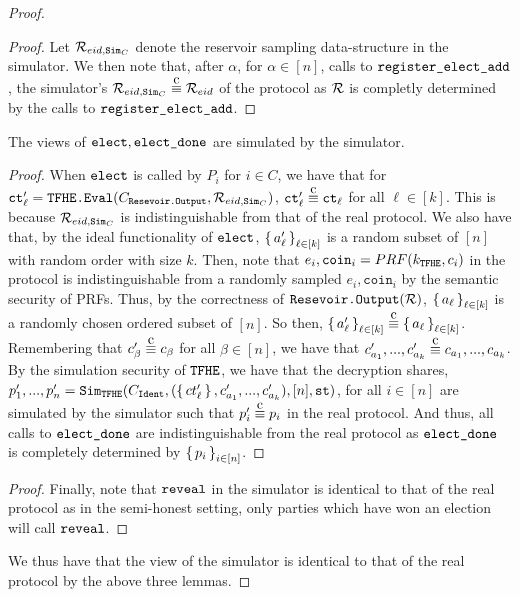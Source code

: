 \begin{theorem}
\begin{proof}
\begin{lemma}
\begin{proof}
				Let $\mathcal{R}_{{eid}, \texttt{Sim}_C}$ denote the reservoir sampling data-structure in the simulator.
				We then note that, after $\alpha$, for $\alpha \in [n]$,  calls to $\texttt{register\_elect\_add}$, the simulator's $\resSampling_{\eid, \simCMSLE} \compInd \resSampling_\eid$
				of the protocol as $\mathcal{R}$ is completly determined by the calls to $\texttt{register\_elect\_add}$.
			\end{proof}
		\end{lemma}
		\begin{lemma}
			The views of $\texttt{elect}, \texttt{elect\_done}$ are simulated by the simulator.
			\begin{proof}
				When $\texttt{elect}$ is called by $P_i$ for $i \in C$, we have that for $\texttt{ct}'_\ell = \texttt{TFHE.Eval}(C_{\texttt{Resevoir.Output}}, \mathcal{R}_{{eid}, \texttt{Sim}_C})$, $\ct'_\ell \compInd \ct_\ell$ for all $\ell \in [k]$.
				This is because $\mathcal{R}_{{eid}, \texttt{Sim}_C}$ is indistinguishable from that of the real protocol.
				We also have that, by the ideal functionality of $\texttt{elect}$, $\set{a'_\ell}_{\ell \in [k]}$ is a random subset of $[n]$ with random order with size $k$.
				Then, note that $e_i, \texttt{coin}_i = PRF(k_{\texttt{TFHE}}, c_i)$ in the protocol is indistinguishable from a randomly sampled $e_i, \texttt{coin}_i$
				by the semantic security of PRFs. Thus, by the correctness of $\texttt{Resevoir.Output}(\mathcal{R})$, $\set{a_\ell}_{\ell \in [k]}$ is a randomly chosen ordered subset of $[n]$.
				So then, $\set{a'_\ell}_{\ell \in [k]} \compInd \set{a_\ell}_{\ell \in [k]}$.
				Remembering that $c'_\beta \compInd c_\beta$ for all $\beta \in [n]$, we have that $c'_{a_1}, ..., c'_{a_k} \compInd c_{a_1}, ..., c_{a_k}$.
				By the simulation security of ${\texttt{TFHE}}$, we have that the decryption shares, $p'_1,..., p'_n = \texttt{Sim}_{{\texttt{TFHE}}}(C_{\texttt{Ident}}, (\set{ct'_\ell}, c'_{a_1}, ..., c'_{a_k}), [n], \texttt{st})$, for all $i \in [n]$ are simulated by the simulator such that $p'_i \compInd p_i$ in the real protocol.
				And thus, all calls to $\texttt{elect\_done}$ are indistinguishable from the real protocol as $\texttt{elect\_done}$ is completely
				determined by $\set{p_i}_{i \in [n]}$.
			\end{proof}
		\end{lemma}
		\begin{lemma}
			\begin{proof}
				Finally, note that $\texttt{reveal}$ in the simulator is identical to that of the real protocol
				as in the semi-honest setting, only parties which have won an election will call $\texttt{reveal}$.
			\end{proof}
		\end{lemma}
		We thus have that the view of the simulator is identical to that of the real protocol by the above three lemmas.
	\end{proof}
\end{theorem}


